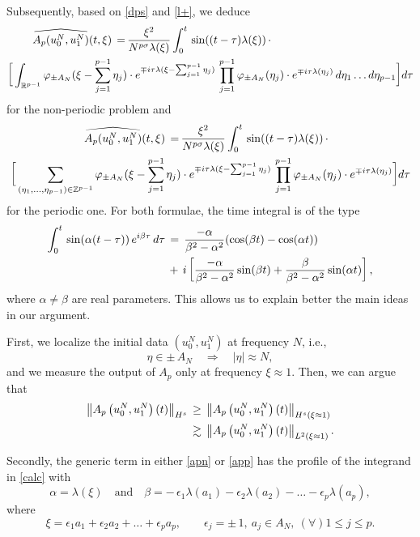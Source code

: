 \documentclass{amsart}
\newcommand{\R}{\mathbb{R}}
\begin{document}
Subsequently, based on \eqref{dps} and \eqref{l+}, we deduce
\begin{equation}
\aligned
\widehat{A_p(u^N_0,u^N_1)}(t,\xi)\,=\,& \frac{\xi^2}{N^{p\sigma}\lambda(\xi)}\int_0^t \,\sin((t-\tau) \lambda(\xi))\,\cdot\\
\bigg[\int_{\R^{p-1}}\varphi_{\pm A_N}(\xi-\sum_{j=1}^{p-1} \eta_j)&\cdot e^{\mp i\tau\lambda(\xi-\sum_{j=1}^{p-1}\eta_j)}\,
\prod_{j=1}^{p-1}\varphi_{\pm A_N}(\eta_j)\cdot e^{\mp i\tau\lambda(\eta_j)}\,d\eta_1\ldots d\eta_{p-1}\bigg]d\tau
\endaligned
\label{apn}
\end{equation}
for the non-periodic problem and 
\begin{equation}
\aligned
\widehat{A_p(u^N_0,u^N_1)}(t,\xi)\,=\,& \frac{\xi^2}{N^{p\sigma}\lambda(\xi)}\int_0^t \,\sin((t-\tau) \lambda(\xi))\,\cdot\\
\bigg[\sum_{(\eta_1, \ldots, \eta_{p-1})\in \mathbb{Z}^{p-1}}\varphi_{\pm A_N}(\xi-\sum_{j=1}^{p-1} \eta_j)&\cdot e^{\mp i\tau\lambda(\xi-\sum_{j=1}^{p-1}\eta_j)}\,
\prod_{j=1}^{p-1}\varphi_{\pm A_N}(\eta_j)\cdot e^{\mp i\tau\lambda(\eta_j)}\bigg]d\tau
\endaligned
\label{app}
\end{equation}
for the periodic one. For both formulae, the time integral is of the type
\begin{equation}
\aligned
\int_0^t\,\sin(\alpha(t-\tau))\,e^{i\beta \tau}\,d\tau\,&=\,\frac{-\alpha}{\beta^2-\alpha^2}(\cos (\beta t)-\cos (\alpha t))\\
&+\,i\left[\frac{-\alpha}{\beta^2-\alpha^2}\sin (\beta t) + \frac{\beta}{\beta^2-\alpha^2}\sin (\alpha t)\right],
\endaligned
\label{calc}
\end{equation}
where $\alpha\neq \beta$ are real parameters. This allows us to explain better the main ideas in our argument. 

First, we localize the initial data $(u^N_0,u^N_1)$ at frequency $N$, i.e.,
\[
\eta\in \pm \,A_N\quad \Longrightarrow \quad |\eta| \approx N,\]
and we measure the output of $A_p$ only at frequency $\xi \approx 1$. Then, we can argue that
\begin{equation}
\aligned
\left\|A_{p}\left(u_0^N,u_1^N\right)(t)\right\|_{H^s}\,&\geq\, \left\|A_{p}\left(u_0^N,u_1^N\right)(t)\right\|_{H^{s}(\xi \approx 1)}\\
&\gtrsim\, \left\|A_{p}\left(u_0^N,u_1^N\right)(t)\right\|_{L^2(\xi \approx 1)}.
\endaligned
\label{aphs}
\end{equation}

Secondly, the generic term in either \eqref{apn} or \eqref{app} has the profile of the integrand in \eqref{calc} with
\begin{equation}
\alpha=\lambda(\xi) \quad \text{and} \quad \beta= -\,\epsilon_1\lambda(a_1)-\epsilon_2\lambda(a_2)-\ldots-\epsilon_p\lambda(a_p),
\label{ab}
\end{equation}
where
\begin{equation}
\xi=  \epsilon_1 a_1+\epsilon_2 a_2+ \ldots+\epsilon_p a_p, \qquad \epsilon_j=\pm \,1, \ a_j\in A_N, \ (\forall)1\leq j\leq p.\label{xi}
\end{equation}
\end{document}
